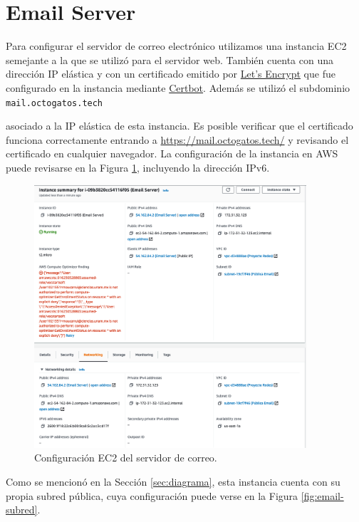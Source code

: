 \documentclass{article}
\newcommand{\ttt}[1]{%
\texttt{#1}%
}
\begin{document}
\section{Email Server}

Para configurar el servidor de correo electr\'onico
utilizamos una instancia EC2 semejante a la que
se utiliz\'o para el servidor web.   Tambi\'en cuenta
con una direcci\'on IP el\'astica y con un certificado
emitido por \href{https://letsencrypt.org/}{Let's
Encrypt} que fue configurado en la instancia mediante
\href{https://certbot.eff.org/}{Certbot}.   Adem\'as
se utiliz\'o el subdominio \ttt{mail.octogatos.tech}
asociado a la IP el\'astica de esta instancia.   Es
posible verificar que el certificado funciona
correctamente entrando a
\href{https://mail.octogatos.tech/}{https://mail.octogatos.tech/}
y revisando el certificado en cualquier navegador.
La configuraci\'on de la instancia en AWS puede
revisarse en la Figura \ref{fig:email-instancia},
incluyendo la direcci\'on IPv6.

\begin{figure}[H]
  \centering
  \includegraphics[width=0.9\textwidth]{email/instancia}
  \caption{Configuraci\'on EC2 del servidor de correo.}
  \label{fig:email-instancia}
\end{figure}

Como se mencion\'o en la Secci\'on \ref{sec:diagrama},
esta instancia cuenta con su propia subred p\'ublica,
cuya configuraci\'on puede verse en la Figura
\ref{fig:email-subred}.
\end{document}
